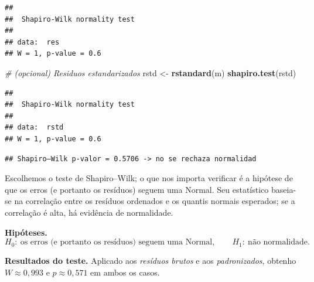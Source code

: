 \documentclass[
]{article}
\newenvironment{Shaded}{\begin{snugshade}}{\end{snugshade}}
\newcommand{\CommentTok}[1]{\textcolor[rgb]{0.56,0.35,0.01}{\textit{#1}}}
\newcommand{\FloatTok}[1]{\textcolor[rgb]{0.00,0.00,0.81}{#1}}
\newcommand{\FunctionTok}[1]{\textcolor[rgb]{0.13,0.29,0.53}{\textbf{#1}}}
\newcommand{\NormalTok}[1]{#1}
\newcommand{\OtherTok}[1]{\textcolor[rgb]{0.56,0.35,0.01}{#1}}
\newcommand{\SpecialCharTok}[1]{\textcolor[rgb]{0.81,0.36,0.00}{\textbf{#1}}}
\newcommand{\StringTok}[1]{\textcolor[rgb]{0.31,0.60,0.02}{#1}}
\begin{document}
\begin{verbatim}
## 
##  Shapiro-Wilk normality test
## 
## data:  res
## W = 1, p-value = 0.6
\end{verbatim}

\begin{Shaded}
\begin{Highlighting}[]
\CommentTok{\# (opcional) Residuos estandarizados}
\NormalTok{rstd }\OtherTok{\textless{}{-}} \FunctionTok{rstandard}\NormalTok{(m)}
\FunctionTok{shapiro.test}\NormalTok{(rstd)}
\end{Highlighting}
\end{Shaded}

\begin{verbatim}
## 
##  Shapiro-Wilk normality test
## 
## data:  rstd
## W = 1, p-value = 0.6
\end{verbatim}

\begin{Shaded}
\end{Shaded}

\begin{verbatim}
## Shapiro–Wilk p-valor = 0.5706 -> no se rechaza normalidad
\end{verbatim}

Escolhemos o teste de Shapiro--Wilk; o que nos importa verificar é a
hipótese de que os erros (e portanto os resíduos) seguem uma Normal. Seu
estatístico baseia-se na correlação entre os resíduos ordenados e os
quantis normais esperados; se a correlação é alta, há evidência de
normalidade.

\textbf{Hipóteses.} \[
H_0:\ \text{os erros (e portanto os resíduos) seguem uma Normal},
\qquad
H_1:\ \text{não normalidade}.
\]

\textbf{Resultados do teste.} Aplicado aos \emph{resíduos brutos} e aos
\emph{padronizados}, obtenho \(W \approx 0{,}993\) e
\(p \approx 0{,}571\) em ambos os casos.
\end{document}
